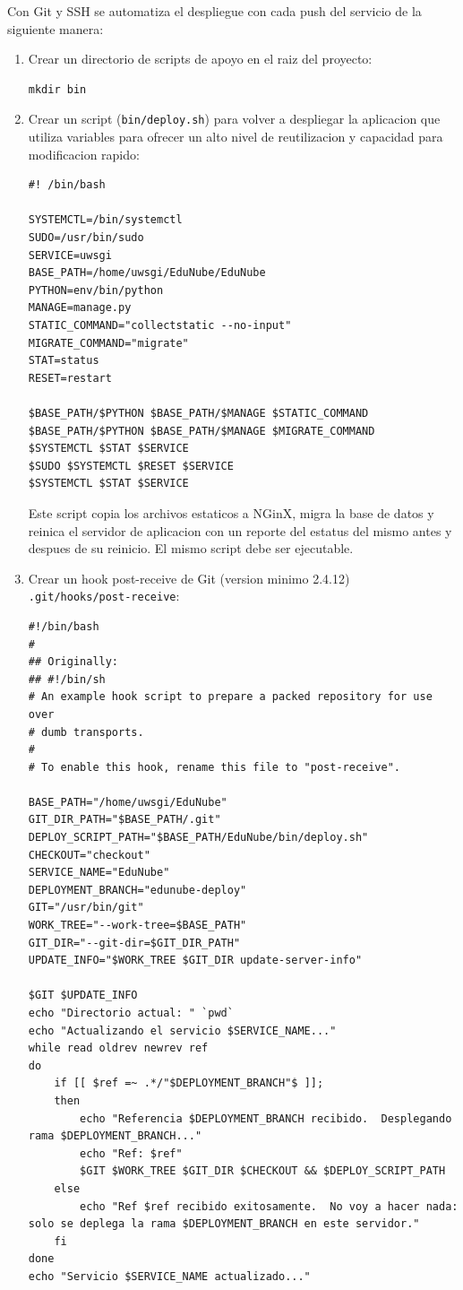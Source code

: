 Con Git y SSH se automatiza el despliegue con cada push del servicio de la siguiente manera:
\begin{enumerate}
	\item Crear un directorio de scripts de apoyo en el raiz del proyecto:
    \begin{lstlisting}
mkdir bin
    \end{lstlisting}
    \item Crear un script (\texttt{bin/deploy.sh}) para volver a despliegar la aplicacion que utiliza variables para ofrecer un alto nivel de reutilizacion y capacidad para modificacion rapido:
    \begin{lstlisting}
#! /bin/bash

SYSTEMCTL=/bin/systemctl
SUDO=/usr/bin/sudo
SERVICE=uwsgi
BASE_PATH=/home/uwsgi/EduNube/EduNube
PYTHON=env/bin/python
MANAGE=manage.py
STATIC_COMMAND="collectstatic --no-input"
MIGRATE_COMMAND="migrate"
STAT=status
RESET=restart

$BASE_PATH/$PYTHON $BASE_PATH/$MANAGE $STATIC_COMMAND
$BASE_PATH/$PYTHON $BASE_PATH/$MANAGE $MIGRATE_COMMAND
$SYSTEMCTL $STAT $SERVICE
$SUDO $SYSTEMCTL $RESET $SERVICE
$SYSTEMCTL $STAT $SERVICE
    \end{lstlisting}
    Este script copia los archivos estaticos a NGinX, migra la base de datos y reinica el servidor de aplicacion con un reporte del estatus del mismo antes y despues de su reinicio. El mismo script debe ser ejecutable.
    \item Crear un hook post-receive de Git (version minimo 2.4.12) \\
    \texttt{.git/hooks/post-receive}:
    \begin{lstlisting}[breaklines=true]
#!/bin/bash
#
## Originally:
## #!/bin/sh
# An example hook script to prepare a packed repository for use over
# dumb transports.
#
# To enable this hook, rename this file to "post-receive".

BASE_PATH="/home/uwsgi/EduNube"
GIT_DIR_PATH="$BASE_PATH/.git"
DEPLOY_SCRIPT_PATH="$BASE_PATH/EduNube/bin/deploy.sh"
CHECKOUT="checkout"
SERVICE_NAME="EduNube"
DEPLOYMENT_BRANCH="edunube-deploy"
GIT="/usr/bin/git"
WORK_TREE="--work-tree=$BASE_PATH"
GIT_DIR="--git-dir=$GIT_DIR_PATH"
UPDATE_INFO="$WORK_TREE $GIT_DIR update-server-info"

$GIT $UPDATE_INFO
echo "Directorio actual: " `pwd`
echo "Actualizando el servicio $SERVICE_NAME..."
while read oldrev newrev ref
do
    if [[ $ref =~ .*/"$DEPLOYMENT_BRANCH"$ ]];
    then
        echo "Referencia $DEPLOYMENT_BRANCH recibido.  Desplegando rama $DEPLOYMENT_BRANCH..."
        echo "Ref: $ref"
        $GIT $WORK_TREE $GIT_DIR $CHECKOUT && $DEPLOY_SCRIPT_PATH
    else
        echo "Ref $ref recibido exitosamente.  No voy a hacer nada: solo se deplega la rama $DEPLOYMENT_BRANCH en este servidor."
    fi
done
echo "Servicio $SERVICE_NAME actualizado..."


\end{lstlisting}
\end{enumerate}
